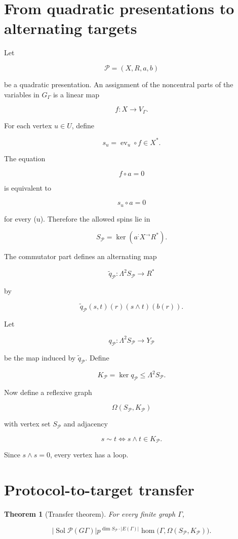\documentclass[11pt]{article}
\newtheorem{theorem}{Theorem}[section]
\begin{document}
\section{From quadratic presentations to alternating targets}

Let

\[
\mathcal P=(X,R,a,b)
\]

be a quadratic presentation. An assignment of the noncentral parts of the variables in $G_\Gamma$ is a linear map

\[
f:X\to V_\Gamma.
\]

For each vertex $u\in U$, define

\[
s_u=\operatorname{ev}_u\circ f\in X^*.
\]

The equation

\[
f\circ a=0
\]

is equivalent to

\[
s_u\circ a=0
\]

for every (u). Therefore the allowed spins lie in

\[
S_\mathcal P=\ker(a^:X^\to R^*).
\]

The commutator part defines an alternating map

\[
\widetilde q_\mathcal P:\Lambda^2S_\mathcal P\to R^*
\]

by

\[
\widetilde q_\mathcal P(s,t)(r)
(s\wedge t)(b(r)).
\]

Let

\[
q_\mathcal P:\Lambda^2S_\mathcal P\to Y_\mathcal P
\]

be the map induced by $\widetilde q_\mathcal P$. Define

\[
K_\mathcal P=\ker q_\mathcal P\le \Lambda^2S_\mathcal P.
\]

Now define a reflexive graph

\[
\Omega(S_\mathcal P,K_\mathcal P)
\]

with vertex set $S_\mathcal P$ and adjacency

\[
s\sim t
\iff
s\wedge t\in K_\mathcal P.
\]

Since $s\wedge s=0$, every vertex has a loop.

\section{Protocol-to-target transfer}

\begin{theorem}[Transfer theorem]
For every finite graph $\Gamma$,

\[
|\operatorname{Sol}
{\mathcal P}(G
\Gamma)|
p^{\dim S_\mathcal P\cdot |E(\Gamma)|}
\operatorname{hom}
\bigl(
\Gamma,\Omega(S_\mathcal P,K_\mathcal P)
\bigr).
\]

\end{theorem}
\end{document}
